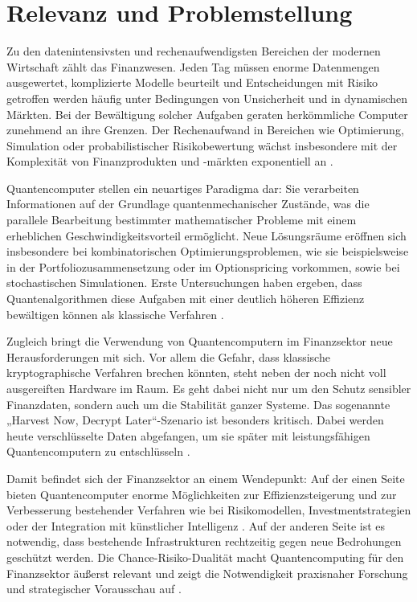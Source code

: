 \section{Relevanz und Problemstellung}
Zu den datenintensivsten und rechenaufwendigsten Bereichen der modernen Wirtschaft zählt das Finanzwesen. Jeden Tag müssen enorme Datenmengen ausgewertet, komplizierte Modelle beurteilt und Entscheidungen mit Risiko getroffen werden   häufig unter Bedingungen von Unsicherheit und in dynamischen Märkten. Bei der Bewältigung solcher Aufgaben geraten herkömmliche Computer zunehmend an ihre Grenzen. Der Rechenaufwand in Bereichen wie Optimierung, Simulation oder probabilistischer Risikobewertung wächst insbesondere mit der Komplexität von Finanzprodukten und -märkten exponentiell an \cite{springer2025,plos2024}.

Quantencomputer stellen ein neuartiges Paradigma dar: Sie verarbeiten Informationen auf der Grundlage quantenmechanischer Zustände, was die parallele Bearbeitung bestimmter mathematischer Probleme mit einem erheblichen Geschwindigkeitsvorteil ermöglicht. Neue Lösungsräume eröffnen sich insbesondere bei kombinatorischen Optimierungsproblemen, wie sie beispielsweise in der Portfoliozusammensetzung oder im Optionspricing vorkommen, sowie bei stochastischen Simulationen. Erste Untersuchungen haben ergeben, dass Quantenalgorithmen diese Aufgaben mit einer deutlich höheren Effizienz bewältigen können als klassische Verfahren \cite{quantumjournal2020,orus2019}.

Zugleich bringt die Verwendung von Quantencomputern im Finanzsektor neue Herausforderungen mit sich. Vor allem die Gefahr, dass klassische kryptographische Verfahren brechen könnten, steht neben der noch nicht voll ausgereiften Hardware im Raum. Es geht dabei nicht nur um den Schutz sensibler Finanzdaten, sondern auch um die Stabilität ganzer Systeme. Das sogenannte „Harvest Now, Decrypt Later“-Szenario ist besonders kritisch. Dabei werden heute verschlüsselte Daten abgefangen, um sie später mit leistungsfähigen Quantencomputern zu entschlüsseln \cite{finance21net}.

Damit befindet sich der Finanzsektor an einem Wendepunkt: Auf der einen Seite bieten Quantencomputer enorme Möglichkeiten zur Effizienzsteigerung und zur Verbesserung bestehender Verfahren   wie bei Risikomodellen, Investmentstrategien oder der Integration mit künstlicher Intelligenz \cite{finance21net}. Auf der anderen Seite ist es notwendig, dass bestehende Infrastrukturen rechtzeitig gegen neue Bedrohungen geschützt werden. Die Chance-Risiko-Dualität macht Quantencomputing für den Finanzsektor äußerst relevant und zeigt die Notwendigkeit praxisnaher Forschung und strategischer Vorausschau auf \cite{springer2025,orus2019}.




